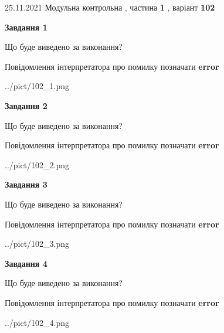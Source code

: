 \documentclass[10pt, ukrainian]{article}
\begin{document}
{25.11.2021 Модульна контрольна , частина \textbf { 1 }, варіант  \No \textbf { 102 }\par}
{
\begin {large}

{\begin {center}\textbf{Завдання 1}\end {center}}\par
Що буде виведено за виконання? \par
Повідомлення інтерпретатора про помилку позначати \textbf{error}

\begin{center}
	{../pict/102_1.png}
\end{center}
\newpage

{\begin {center}\textbf{Завдання 2}\end {center}}\par
Що буде виведено за виконання? \par
Повідомлення інтерпретатора про помилку позначати \textbf{error}

\begin{center}
	{../pict/102_2.png}
\end{center}
\newpage

{\begin {center}\textbf{Завдання 3}\end {center}}\par
Що буде виведено за виконання? \par
Повідомлення інтерпретатора про помилку позначати \textbf{error}

\begin{center}
	{../pict/102_3.png}
\end{center}
\newpage

{\begin {center}\textbf{Завдання 4}\end {center}}\par
Що буде виведено за виконання? \par
Повідомлення інтерпретатора про помилку позначати \textbf{error}

\begin{center}
	{../pict/102_4.png}
\end{center}
\newpage


\end{large}}
\end{document}
